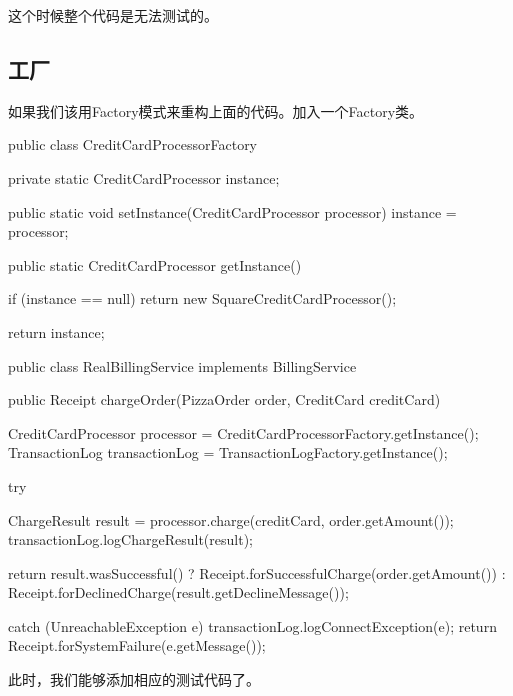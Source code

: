 这个时候整个代码是无法测试的。

\subsection{工厂}

如果我们该用Factory模式来重构上面的代码。加入一个Factory类。

\begin{Java}[CreditCardProcessor的工厂]
public class CreditCardProcessorFactory {

  private static CreditCardProcessor instance;

  public static void setInstance(CreditCardProcessor processor) {
    instance = processor;
  }

  public static CreditCardProcessor getInstance() {
    if (instance == null) {
      return new SquareCreditCardProcessor();
    }

    return instance;
  }
}
\end{Java}

\begin{Java}[使用Factory的服务实现]
public class RealBillingService implements BillingService {
  public Receipt chargeOrder(PizzaOrder order, CreditCard creditCard) {
    CreditCardProcessor processor = CreditCardProcessorFactory.getInstance();
    TransactionLog transactionLog = TransactionLogFactory.getInstance();

    try {
      ChargeResult result = processor.charge(creditCard, order.getAmount());
      transactionLog.logChargeResult(result);

      return result.wasSuccessful()
          ? Receipt.forSuccessfulCharge(order.getAmount())
          : Receipt.forDeclinedCharge(result.getDeclineMessage());
     } catch (UnreachableException e) {
      transactionLog.logConnectException(e);
      return Receipt.forSystemFailure(e.getMessage());
    }
  }
}
\end{Java}

此时，我们能够添加相应的测试代码了。

